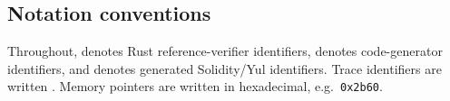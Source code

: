 \subsection*{Notation conventions}
Throughout,  denotes Rust reference-verifier identifiers,
 denotes code-generator identifiers, and 
denotes generated Solidity/\allowbreak{}Yul identifiers. Trace identifiers are written
. Memory pointers are written in hexadecimal, e.g.\
\texttt{0x2b60}.
